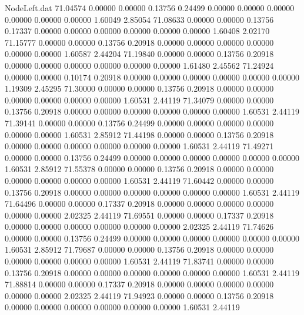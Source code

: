 \begin{filecontents}{NodeLeft.dat}
  71.04574    0.00000    0.00000     0.13756    0.24499    0.00000    0.00000    0.00000    0.00000    0.00000    0.00000    1.60049    2.85054
  71.08633    0.00000    0.00000     0.13756    0.17337    0.00000    0.00000    0.00000    0.00000    0.00000    0.00000    1.60408    2.02170
  71.15777    0.00000    0.00000     0.13756    0.20918    0.00000    0.00000    0.00000    0.00000    0.00000    0.00000    1.60587    2.44204
  71.19840    0.00000    0.00000     0.13756    0.20918    0.00000    0.00000    0.00000    0.00000    0.00000    0.00000    1.61480    2.45562
  71.24924    0.00000    0.00000     0.10174    0.20918    0.00000    0.00000    0.00000    0.00000    0.00000    0.00000    1.19309    2.45295
  71.30000    0.00000    0.00000     0.13756    0.20918    0.00000    0.00000    0.00000    0.00000    0.00000    0.00000    1.60531    2.44119
  71.34079    0.00000    0.00000     0.13756    0.20918    0.00000    0.00000    0.00000    0.00000    0.00000    0.00000    1.60531    2.44119
  71.39141    0.00000    0.00000     0.13756    0.24499    0.00000    0.00000    0.00000    0.00000    0.00000    0.00000    1.60531    2.85912
  71.44198    0.00000    0.00000     0.13756    0.20918    0.00000    0.00000    0.00000    0.00000    0.00000    0.00000    1.60531    2.44119
  71.49271    0.00000    0.00000     0.13756    0.24499    0.00000    0.00000    0.00000    0.00000    0.00000    0.00000    1.60531    2.85912
  71.55378    0.00000    0.00000     0.13756    0.20918    0.00000    0.00000    0.00000    0.00000    0.00000    0.00000    1.60531    2.44119
  71.60442    0.00000    0.00000     0.13756    0.20918    0.00000    0.00000    0.00000    0.00000    0.00000    0.00000    1.60531    2.44119
  71.64496    0.00000    0.00000     0.17337    0.20918    0.00000    0.00000    0.00000    0.00000    0.00000    0.00000    2.02325    2.44119
  71.69551    0.00000    0.00000     0.17337    0.20918    0.00000    0.00000    0.00000    0.00000    0.00000    0.00000    2.02325    2.44119
  71.74626    0.00000    0.00000     0.13756    0.24499    0.00000    0.00000    0.00000    0.00000    0.00000    0.00000    1.60531    2.85912
  71.79687    0.00000    0.00000     0.13756    0.20918    0.00000    0.00000    0.00000    0.00000    0.00000    0.00000    1.60531    2.44119
  71.83741    0.00000    0.00000     0.13756    0.20918    0.00000    0.00000    0.00000    0.00000    0.00000    0.00000    1.60531    2.44119
  71.88814    0.00000    0.00000     0.17337    0.20918    0.00000    0.00000    0.00000    0.00000    0.00000    0.00000    2.02325    2.44119
  71.94923    0.00000    0.00000     0.13756    0.20918    0.00000    0.00000    0.00000    0.00000    0.00000    0.00000    1.60531    2.44119

\end{filecontents}
